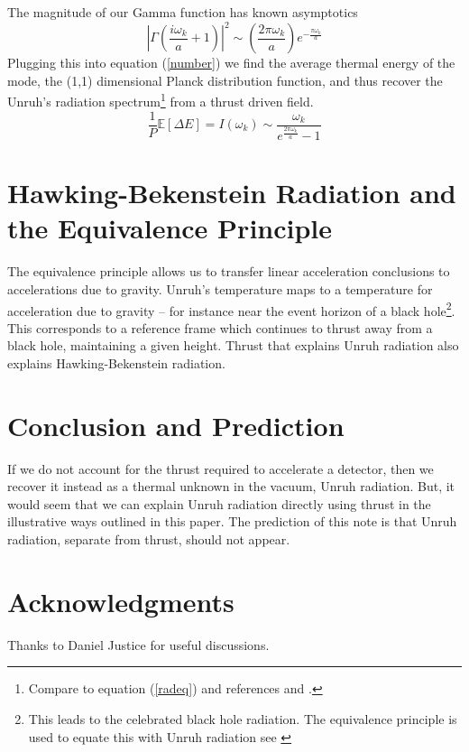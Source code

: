 \documentclass[12pt,a4paper]{article}
\begin{document}
The magnitude of our Gamma function has known asymptotics \cite[Eq.~5.11.9]{NIST:DLMF}
\[
\left|\Gamma\left(\frac{i\omega_k}{a} + 1\right) \right|^2 \sim \left(\frac{2 \pi \omega_k} {a}\right) e^{-\frac{\pi\omega_k}{a}}
\]
Plugging this into equation (\ref{number}) we find the average thermal energy of the mode, the (1,1) dimensional Planck distribution function, and thus recover the Unruh's radiation spectrum\footnote{Compare to equation (\ref{radeq}) and references \cite{unruh} and \cite{Frodden}.} from a thrust driven field.
\[
\frac{1}{P} \mathbb{E}[\Delta E] = I(\omega_k) \sim \frac{\omega_k}{e^{\frac{2 \pi \omega_k}{a}}-1}
\]

\section{Hawking-Bekenstein Radiation and the Equivalence Principle}

The equivalence principle allows us to transfer linear acceleration conclusions to accelerations due to gravity.  Unruh's temperature maps to a temperature for acceleration due to gravity -- for instance near the event horizon of a black hole\footnote{This leads to the celebrated black hole radiation.  The equivalence principle is used to equate this with Unruh radiation see \cite{unruh}}.  This corresponds to a reference frame which continues to thrust away from a black hole, maintaining a given height.  Thrust that explains Unruh radiation also explains Hawking-Bekenstein radiation.

\section{Conclusion and Prediction}
If we do not account for the thrust required to accelerate a detector, then we recover it instead as a thermal unknown in the vacuum, Unruh radiation.  But, it would seem that we can explain Unruh radiation directly using thrust in the illustrative ways outlined in this paper.  The prediction of this note is that Unruh radiation, separate from thrust, should not appear.

\section{Acknowledgments}
Thanks to Daniel Justice for useful discussions.



\end{document}
